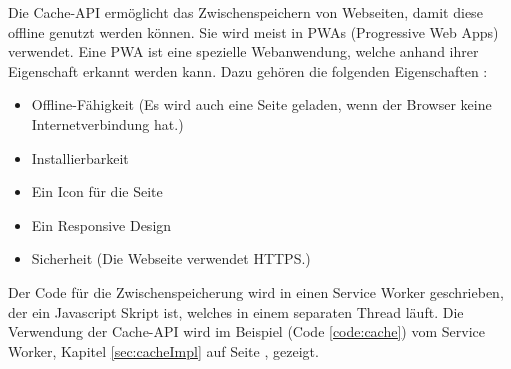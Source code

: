 
Die Cache-API ermöglicht das Zwischenspeichern von Webseiten, damit diese offline genutzt werden können.
Sie wird meist in PWAs (Progressive Web Apps) verwendet. Eine PWA ist eine spezielle Webanwendung, welche anhand ihrer Eigenschaft erkannt werden kann. Dazu gehören die folgenden Eigenschaften \cite{datacodedesignPWA}:
\begin{itemize}
    \item Offline-Fähigkeit (Es wird auch eine Seite geladen, wenn der Browser keine Internetverbindung hat.)
    \item Installierbarkeit 
    \item Ein Icon für die Seite
    \item Ein Responsive Design
    \item Sicherheit (Die Webseite verwendet HTTPS.)
\end{itemize}

Der Code für die Zwischenspeicherung wird in einen Service Worker geschrieben, der ein Javascript Skript ist, welches in einem separaten Thread läuft. 
Die Verwendung der Cache-API wird im Beispiel (Code \ref{code:cache}) vom Service Worker, Kapitel \ref{sec:cacheImpl} auf Seite \pageref{code:cache}, gezeigt.